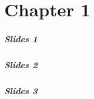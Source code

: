 \part{Chapter 1}

\begin{frame}
	\partpage
\end{frame}

\begin{frame}
	\frametitle{Slides 1}
\end{frame}

\begin{frame}
	\frametitle{Slides 2}
\end{frame}

\begin{frame}
	\frametitle{Slides 3}
\end{frame}
